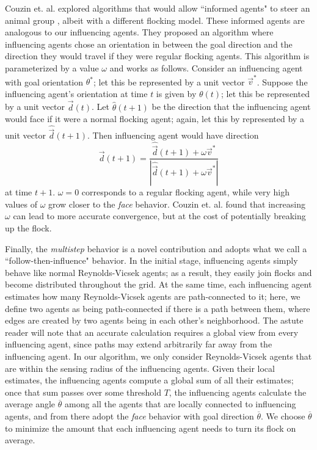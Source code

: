 Couzin et. al. explored algorithms that would allow ``informed agents" to steer
an animal group \cite{couzin2005}, albeit with a different flocking model.
These informed agents are analogous to our influencing agents.
They proposed an algorithm where influencing agents chose an orientation in
between the goal direction and the direction they would travel if they were
regular flocking agents.
This algorithm is parameterized by a value $\omega$ and works as follows.
Consider an influencing agent with goal orientation $\theta^*$; let this be
represented by a unit vector $\vec{v}^*$.
Suppose the influencing agent's orientation at time $t$ is given by
$\theta(t)$; let this be represented by a unit vector $\vec{d}(t)$.
Let $\hat{\theta}(t+1)$ be the direction that the influencing agent would face
if it were a normal flocking agent; again, let this by represented by a unit
vector $\hat{\vec{d}}(t+1)$.
Then influencing agent would have direction
$$\vec{d}(t+1) = \frac{\hat{\vec{d}}(t+1) + \omega\vec{v}^*}
{|\hat{\vec{d}}(t+1) + \omega\vec{v}^*|}$$
at time $t+1$.
$\omega=0$ corresponds to a regular flocking agent, while very high
values of $\omega$ grow closer to the \textit{face} behavior.
Couzin et. al. found that increasing $\omega$ can lead to more accurate
convergence, but at the cost of potentially breaking up the flock.

Finally, the \textit{multistep} behavior is a novel contribution and adopts
what we call a ``follow-then-influence" behavior.
In the initial stage, influencing agents simply behave like normal Reynolds-Vicsek 
agents; as a result, they easily join flocks and become distributed throughout
the grid.
At the same time, each influencing agent estimates how many Reynolds-Vicsek agents
are path-connected to it; here, we define two agents as being path-connected if
there is a path between them, where edges are created by two agents being in
each other's neighborhood.
The astute reader will note that an accurate calculation requires a global view
from every influencing agent, since paths may extend arbitrarily far away from
the influencing agent.
In our algorithm, we only consider Reynolds-Vicsek agents that are within the
sensing radius of the influencing agents.
Given their local estimates, the influencing agents compute a global sum of all
their estimates; once that sum passes over some threshold $T$, the influencing
agents calculate the average angle $\overline{\theta}$ among all the agents that
are locally connected to influencing agents, and from there adopt the
\textit{face} behavior with goal direction $\overline{\theta}$.
We choose $\overline{\theta}$ to minimize the amount that each influencing 
agent needs to turn its flock on average.

